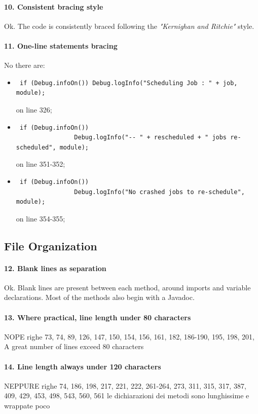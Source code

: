 \documentclass[english]{article}
\begin{document}
\paragraph{10. Consistent bracing style}
Ok.
The code is consistently braced following the \textit{"Kernighan and Ritchie"} style.

\paragraph{11. One-line statements bracing}
No there are:
\begin{itemize}
	\item \begin{lstlisting} if (Debug.infoOn()) Debug.logInfo("Scheduling Job : " + job, module); \end{lstlisting} on line 326;
	\item \begin{lstlisting} if (Debug.infoOn())
                Debug.logInfo("-- " + rescheduled + " jobs re-scheduled", module); \end{lstlisting} on line 351-352;
    \item \begin{lstlisting} if (Debug.infoOn())
                Debug.logInfo("No crashed jobs to re-schedule", module); \end{lstlisting} on line 354-355;
\end{itemize}

\subsection{File Organization}
\paragraph{12. Blank lines as separation}
Ok.
Blank lines are present between each method, around imports and variable declarations.
Most of the methods also begin with a Javadoc.

\paragraph{13. Where practical, line length under 80 characters}
NOPE
righe 73, 74, 89, 126, 147, 150, 154, 156, 161, 182, 186-190, 195, 198, 201, 
A great number of lines exceed 80 characters

\paragraph{14. Line length always under 120 characters}
NEPPURE
righe 74, 186, 198, 217, 221, 222, 261-264, 273, 311, 315, 317, 387, 409, 429, 453, 498, 543, 560, 561
le dichiarazioni dei metodi sono lunghissime e wrappate poco
\end{document}
